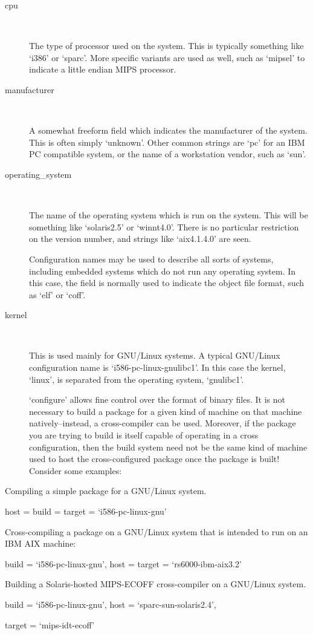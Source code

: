 \begin{description}
\item[cpu]
\ %

The type of processor used on the system. This is typically something like `i386' or `sparc'. More specific variants are used as well, such as `mipsel' to indicate a little endian MIPS processor. 

\item[manufacturer]
\ %

A somewhat freeform field which indicates the manufacturer of the system. This is often simply `unknown'. Other common strings are `pc' for an IBM PC compatible system, or the name of a workstation vendor, such as `sun'. 

\item[operating\_{}system]
\ %

The name of the operating system which is run on the system. This will be something like `solaris2.5' or `winnt4.0'. There is no particular restriction on the version number, and strings like `aix4.1.4.0' are seen. 

Configuration names may be used to describe all sorts of systems, including embedded systems which do not run any operating system. In this case, the field is normally used to indicate the object file format, such as `elf' or `coff'. 


\item[kernel]
\ %

This is used mainly for GNU/Linux systems. A typical GNU/Linux configuration name is `i586-pc-linux-gnulibc1'. In this case the kernel, `linux', is separated from the operating system, `gnulibc1'. 

`configure' allows fine control over the format of binary files. It is not necessary to build a package for a given kind of machine on that machine natively--instead, a cross-compiler can be used. Moreover, if the package you are trying to build is itself capable of operating in a cross configuration, then the build system need not be the same kind of machine used to host the cross-configured package once the package is built! Consider some examples: 

\end{description}

\bigskip
\noindent
Compiling a simple package for a GNU/Linux system.

host = build = target = `i586-pc-linux-gnu' 

\bigskip
\noindent
Cross-compiling a package on a GNU/Linux system that is intended to run on
an IBM AIX machine:

build = `i586-pc-linux-gnu', host = target = `rs6000-ibm-aix3.2' 

\bigskip
\noindent
Building a Solaris-hosted MIPS-ECOFF cross-compiler on a GNU/Linux 
system.

build = `i586-pc-linux-gnu', host = `sparc-sun-solaris2.4',

target = `mips-idt-ecoff' 

